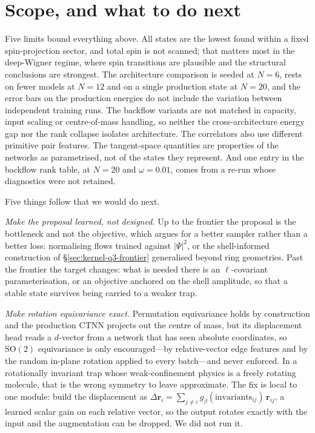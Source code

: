 \section{Scope, and what to do next}
\label{sec:implications}

Five limits bound everything above. All states are the lowest found within a fixed
spin-projection sector, and total spin is not scanned; that matters most in the deep-Wigner
regime, where spin transitions are plausible and the structural conclusions are strongest.
The architecture comparison is seeded at $N{=}6$, rests on fewer models at $N{=}12$ and on a
single production state at $N{=}20$, and the error bars on the production energies do not
include the variation between independent training runs. The backflow variants are not
matched in capacity, input scaling or centre-of-mass handling, so neither the
cross-architecture energy gap nor the rank collapse isolates architecture. The correlators
also use different primitive pair features. The tangent-space quantities are properties of
the networks as parametrised, not of the states they represent. And one entry in the
backflow rank table, at $N{=}20$ and $\omega=0.01$, comes from a re-run whose diagnostics
were not retained.

Five things follow that we would do next.

\emph{Make the proposal learned, not designed.} Up to the frontier the proposal is the
bottleneck and not the objective, which argues for a better sampler rather than a better
loss: normalising flows trained against $|\Psi|^2$, or the shell-informed construction of
\S\ref{sec:kernel-q3-frontier} generalised beyond ring geometries. Past the frontier the
target changes: what is needed there is an $\ell$-covariant parameterisation, or an objective
anchored on the shell amplitude, so that a stable state survives being carried to a weaker
trap.

\emph{Make rotation equivariance exact.} Permutation equivariance holds by construction and
the production CTNN projects out the centre of mass, but its displacement head reads a $d$-vector from a
network that has seen absolute coordinates, so $\mathrm{SO}(2)$ equivariance is only
encouraged---by relative-vector edge features and by the random in-plane rotation applied to
every batch---and never enforced. In a rotationally invariant trap whose weak-confinement
physics is a freely rotating molecule, that is the wrong symmetry to leave approximate.
The fix is local to one module: build the displacement as
$\Delta\mathbf r_i=\sum_{j\neq i} g_\beta(\text{invariants}_{ij})\,\mathbf r_{ij}$, a learned
scalar gain on each relative vector, so the output rotates exactly with the input and the
augmentation can be dropped. We did not run it.

